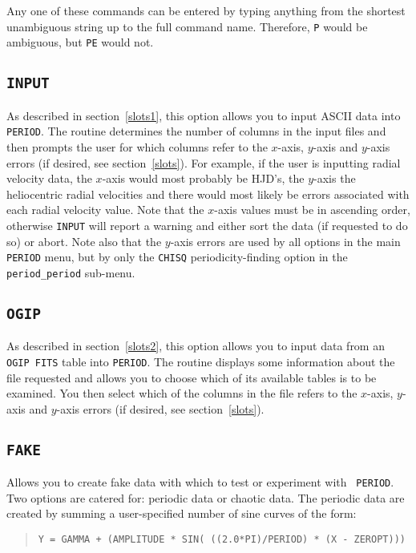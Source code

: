 Any one of these commands can be entered by typing anything from the shortest
unambiguous string up to the full command name. Therefore, {\tt P} would be
ambiguous, but {\tt PE} would not.

\subsection*{\tt INPUT}

As described in section~\ref{slots1}, this option allows you to input
ASCII data into {\tt PERIOD}. The routine determines the number of
columns in the input files and then prompts the user for which columns
refer to the $x$-axis, $y$-axis and $y$-axis errors (if desired, see
section~\ref{slots}). For example, if the user is inputting radial
velocity data, the $x$-axis would most probably be HJD's, the $y$-axis
the heliocentric radial velocities and there would most likely be
errors associated with each radial velocity value. Note that the
$x$-axis values must be in ascending order, otherwise {\tt INPUT} will
report a warning and either sort the data (if requested to do so) or
abort.  Note also that the $y$-axis errors are used by all options in
the main {\tt PERIOD} menu, but by only the {\tt CHISQ}
periodicity-finding option in the {\tt period\_period} sub-menu.

\subsection*{\tt OGIP}

As described in section~\ref{slots2}, this option allows you to input data
from an {\tt OGIP FITS} table
into {\tt PERIOD}. The routine displays some information about
the file requested and allows you to choose which of its available
tables is to be examined. You then select which of the columns in the file
refers to the $x$-axis,
$y$-axis and $y$-axis errors (if desired, see section~\ref{slots}).

\subsection*{\tt FAKE}

Allows you to create fake data with which to test or experiment with {\tt
PERIOD}. Two options are catered for: periodic data or chaotic data. The
periodic data are created by summing a user-specified number of sine curves of
the form:

\begin{quote}
{\tt Y = GAMMA + (AMPLITUDE * SIN( ((2.0*PI)/PERIOD) * (X - ZEROPT)))}
\end{quote}

